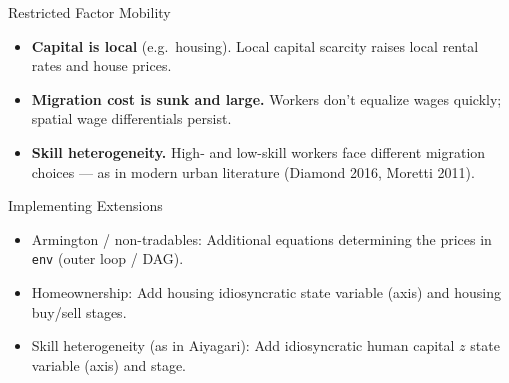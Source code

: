 \documentclass[10pt,aspectratio=169]{beamer}
\begin{document}
\begin{frame}{Restricted Factor Mobility}
  \begin{itemize}
    \item \textbf{Capital is local} (e.g.\ housing). Local capital scarcity raises local rental rates and house prices.
    \item \textbf{Migration cost is sunk and large.} Workers don't equalize wages quickly; spatial wage differentials persist.
    \item \textbf{Skill heterogeneity.} High- and low-skill workers face different migration choices --- as in modern urban literature (Diamond 2016, Moretti 2011).
  \end{itemize}
\end{frame}

\begin{frame}{Implementing Extensions}
  \begin{itemize}
    \item Armington / non-tradables: Additional equations determining the prices in \texttt{env} (outer loop / DAG).
    \item Homeownership: Add housing idiosyncratic state variable (axis) and housing buy/sell stages.
    \item Skill heterogeneity (as in Aiyagari): Add idiosyncratic human capital $z$ state variable (axis) and stage.
  \end{itemize}
\end{frame}
\end{document}
